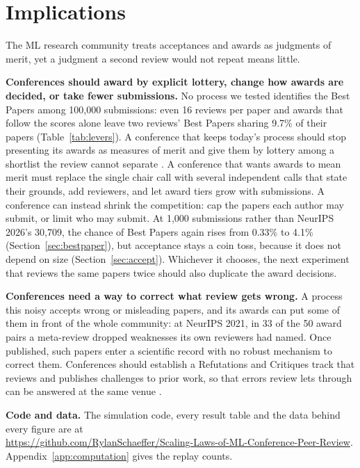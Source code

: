\documentclass{article}
\begin{document}
\section{Implications}\label{sec:implications}

The ML research community treats acceptances and awards as judgments of merit, yet a judgment a second review would not repeat means little.

\textbf{Conferences should award by explicit lottery, change how awards are decided, or take fewer submissions.} No process we tested identifies the Best Papers among 100,000 submissions: even 16 reviews per paper and awards that follow the scores alone leave two reviews' Best Papers sharing 9.7\% of their papers (Table~\ref{tab:levers}). A conference that keeps today's process should stop presenting its awards as measures of merit and give them by lottery among a shortlist the review cannot separate \citep{fang2016lottery,heyard2022rethinking,goldberg2025principled}. A conference that wants awards to mean merit must replace the single chair call with several independent calls that state their grounds, add reviewers, and let award tiers grow with submissions. A conference can instead shrink the competition: cap the papers each author may submit, or limit who may submit. At 1,000 submissions rather than NeurIPS 2026's 30,709, the chance of Best Papers again rises from 0.33\% to 4.1\% (Section~\ref{sec:bestpaper}), but acceptance stays a coin toss, because it does not depend on size (Section~\ref{sec:accept}). Whichever it chooses, the next experiment that reviews the same papers twice should also duplicate the award decisions.

\textbf{Conferences need a way to correct what review gets wrong.} A process this noisy accepts wrong or misleading papers, and its awards can put some of them in front of the whole community: at NeurIPS 2021, in 33 of the 50 award pairs a meta-review dropped weaknesses its own reviewers had named. Once published, such papers enter a scientific record with no robust mechanism to correct them. Conferences should establish a Refutations and Critiques track that reviews and publishes challenges to prior work, so that errors review lets through can be answered at the same venue \citep{schaeffer2025refutations}.

\textbf{Code and data.} The simulation code, every result table and the data behind every figure are at\\ \url{https://github.com/RylanSchaeffer/Scaling-Laws-of-ML-Conference-Peer-Review}. Appendix~\ref{app:computation} gives the replay counts.
\end{document}
